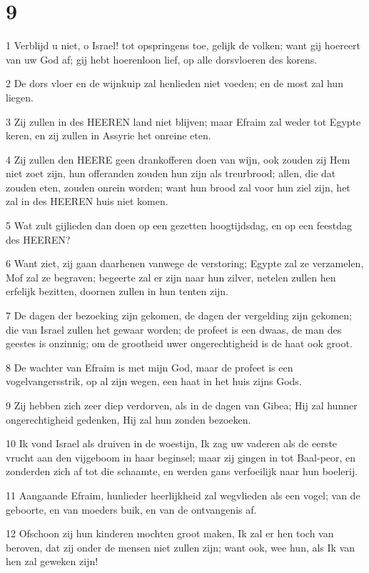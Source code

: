 \chapter{9}

\par 1 Verblijd u niet, o Israel! tot opspringens toe, gelijk de volken; want gij hoereert van uw God af; gij hebt hoerenloon lief, op alle dorsvloeren des korens.
\par 2 De dors vloer en de wijnkuip zal henlieden niet voeden; en de most zal hun liegen.
\par 3 Zij zullen in des HEEREN land niet blijven; maar Efraim zal weder tot Egypte keren, en zij zullen in Assyrie het onreine eten.
\par 4 Zij zullen den HEERE geen drankofferen doen van wijn, ook zouden zij Hem niet zoet zijn, hun offeranden zouden hun zijn als treurbrood; allen, die dat zouden eten, zouden onrein worden; want hun brood zal voor hun ziel zijn, het zal in des HEEREN huis niet komen.
\par 5 Wat zult gijlieden dan doen op een gezetten hoogtijdsdag, en op een feestdag des HEEREN?
\par 6 Want ziet, zij gaan daarhenen vanwege de verstoring; Egypte zal ze verzamelen, Mof zal ze begraven; begeerte zal er zijn naar hun zilver, netelen zullen hen erfelijk bezitten, doornen zullen in hun tenten zijn.
\par 7 De dagen der bezoeking zijn gekomen, de dagen der vergelding zijn gekomen; die van Israel zullen het gewaar worden; de profeet is een dwaas, de man des geestes is onzinnig; om de grootheid uwer ongerechtigheid is de haat ook groot.
\par 8 De wachter van Efraim is met mijn God, maar de profeet is een vogelvangersstrik, op al zijn wegen, een haat in het huis zijns Gods.
\par 9 Zij hebben zich zeer diep verdorven, als in de dagen van Gibea; Hij zal hunner ongerechtigheid gedenken, Hij zal hun zonden bezoeken.
\par 10 Ik vond Israel als druiven in de woestijn, Ik zag uw vaderen als de eerste vrucht aan den vijgeboom in haar beginsel; maar zij gingen in tot Baal-peor, en zonderden zich af tot die schaamte, en werden gans verfoeilijk naar hun boelerij.
\par 11 Aangaande Efraim, hunlieder heerlijkheid zal wegvlieden als een vogel; van de geboorte, en van moeders buik, en van de ontvangenis af.
\par 12 Ofschoon zij hun kinderen mochten groot maken, Ik zal er hen toch van beroven, dat zij onder de mensen niet zullen zijn; want ook, wee hun, als Ik van hen zal geweken zijn!
